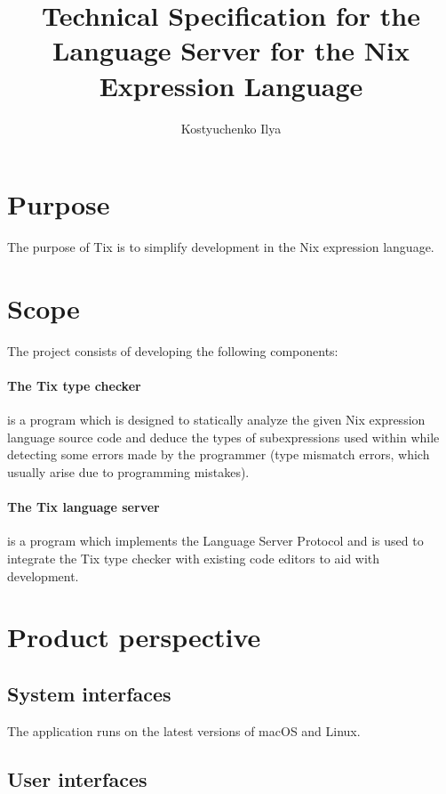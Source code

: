 \documentclass[12pt]{article}
\title{Technical Specification for the Language Server for the Nix Expression Language}
\author{Kostyuchenko Ilya}
\date{}
\begin{document}
\maketitle

\newpage

\tableofcontents

\newpage

\section{Purpose}

The purpose of Tix is to simplify development in the Nix expression language.

\section{Scope}

The project consists of developing the following components:

\paragraph{The Tix type checker} is a program which is designed to statically analyze the given Nix expression language source code and deduce the types of subexpressions used within while detecting some errors made by the programmer (type mismatch errors, which usually arise due to programming mistakes).

\paragraph{The Tix language server} is a program which implements the Language Server Protocol and is used to integrate the Tix type checker with existing code editors to aid with development.

\section{Product perspective}

\subsection{System interfaces}

The application runs on the latest versions of macOS and Linux.

\subsection{User interfaces}
\end{document}
